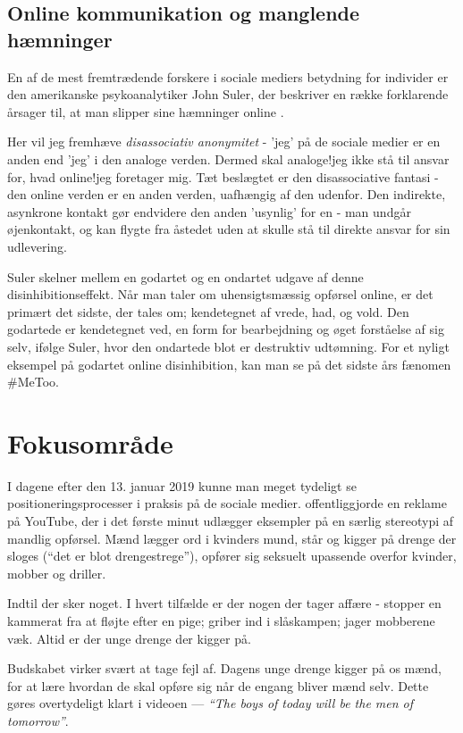 \subsection{Online kommunikation og manglende hæmninger}

En af de mest fremtrædende forskere i sociale mediers betydning
for individer er den amerikanske psykoanalytiker John Suler, der
beskriver en række forklarende årsager til, at man slipper sine
hæmninger online \autocite{sulerOnlineDisinhibitionEffect2004}.

Her vil jeg fremhæve \emph{disassociativ anonymitet} - 'jeg' på de 
sociale medier er en anden end 'jeg' i den analoge verden. Dermed
skal analoge!jeg ikke stå til ansvar for, hvad online!jeg 
foretager mig. Tæt beslægtet er den disassociative fantasi - den
online verden er en anden verden, uafhængig af den udenfor. Den
indirekte, asynkrone kontakt gør endvidere den anden 'usynlig' for
en - man undgår øjenkontakt, og kan flygte fra åstedet uden at
skulle stå til direkte ansvar for sin udlevering.

Suler skelner mellem en godartet og en ondartet udgave af denne
disinhibitionseffekt. Når man taler om uhensigtsmæssig opførsel
online, er det primært det sidste, der tales om; kendetegnet af
vrede, had, og vold. Den godartede er kendetegnet ved, en form for
bearbejdning og øget forståelse af sig selv, ifølge Suler, hvor
den ondartede blot er destruktiv udtømning. For et nyligt eksempel
på godartet online disinhibition, kan man se på det sidste års
fænomen \#MeToo.

\section{Fokusområde}

I dagene efter den 13. januar 2019 kunne man meget tydeligt se
positioneringsprocesser i praksis på de sociale medier.
\citeauthor{gilletteWeBelieveBest2019}  offentliggjorde en reklame
på YouTube, der i det første minut udlægger eksempler på en særlig
stereotypi af mandlig opførsel. Mænd lægger ord i kvinders mund,
står og kigger på drenge der sloges (“det er blot drengestrege”),
opfører sig seksuelt upassende overfor kvinder, mobber og driller.

Indtil der sker noget. I hvert tilfælde er der nogen der tager
affære - stopper en kammerat fra at fløjte efter en pige; griber
ind i slåskampen; jager mobberene væk. Altid er der unge drenge
der kigger på.

Budskabet virker svært at tage fejl af. Dagens unge drenge kigger
på os mænd, for at lære hvordan de skal opføre sig når de engang
bliver mænd selv. Dette gøres overtydeligt klart i videoen --- 
\textit{“The boys of today will be the men of tomorrow”}.

